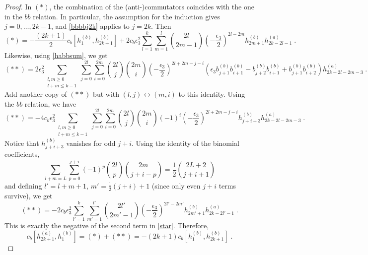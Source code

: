 \documentclass[11pt]{article}
\numberwithin{equation}{section}
\numberwithin{figure}{section}
\numberwithin{table}{section}
\begin{document}
\begin{proof}
In $(*)$, the combination of the (anti-)commutators coincides with the one in the $bb$ relation. In particular, the assumption for the induction gives $j=0,\dots,2k-1$, and \eqref{bbbbj2k} applies to $j=2k$. Then
\begin{equation}
	(*)=-\frac{(2k+1)}{2}c_b\left[h^{(b)}_1,h^{(b)}_{2k+1}\right]+2c_b\epsilon_3^2\sum_{l=1}^k\sum_{m=1}^l\binom{2l}{2m-1}\left(-\frac{\epsilon_3}{2}\right)^{2l-2m}h^{(b)}_{2m+1}h^{(a)}_{2k-2l-1}\;.\label{star}
\end{equation}
Likewise, using \eqref{habbsum}, we get
\begin{equation}
	(**)=2\epsilon_3^2\sum_{\substack{l,m\geq0\\l+m\leq k-1}}\sum_{j=0}^{2l}\sum_{i=0}^{2m}\binom{2l}{j}\binom{2m}{i}\left(-\frac{\epsilon_3}{2}\right)^{2l+2m-j-i}\left(\epsilon_3b^{(b)}_{j+1}b^{(b)}_{i+1}-b^{(b)}_{j+2}b^{(b)}_{i+1}+b^{(b)}_{j+1}b^{(b)}_{i+2}\right)h^{(a)}_{2k-2l-2m-3}\;.
\end{equation}
Add another copy of $(**)$ but with $(l,j)\leftrightarrow(m,i)$ to this identity. Using the $bb$ relation, we have
\begin{equation}
	(**)=-4c_b\epsilon_3^2\sum_{\substack{l,m\geq0\\l+m\leq k-1}}\sum_{j=0}^{2l}\sum_{i=0}^{2m}\binom{2l}{j}\binom{2m}{i}(-1)^i\left(-\frac{\epsilon_3}{2}\right)^{2l+2m-j-i}h^{(b)}_{j+i+3}h^{(a)}_{2k-2l-2m-3}\;.
\end{equation}
Notice that $h^{(b)}_{j+i+3}$ vanishes for odd $j+i$. Using the identity of the binomial coefficients,
\begin{equation}
	\sum_{l+m=L}\sum_{p=0}^{j+i}(-1)^p\binom{2l}{p}\binom{2m}{j+i-p}=\frac{1}{2}\binom{2L+2}{j+i+1}
\end{equation}
and defining $l'=l+m+1$, $m'=\frac{1}{2}(j+i)+1$ (since only even $j+i$ terms survive), we get
\begin{equation}
	(**)=-2c_b\epsilon_3^2\sum_{l'=1}^k\sum_{m'=1}^{l'}\binom{2l'}{2m'-1}\left(-\frac{\epsilon_3}{2}\right)^{2l'-2m'}h^{(b)}_{2m'+1}h^{(a)}_{2k-2l'-1}\;.
\end{equation}
This is exactly the negative of the second term in \eqref{star}. Therefore,
\begin{equation}
	c_b\left[h^{(a)}_{2k+1},h^{(b)}_1\right]=(*)+(**)=-(2k+1)c_b\left[h^{(b)}_1,h^{(b)}_{2k+1}\right]\;.
\end{equation}


\end{proof}
\end{document}
